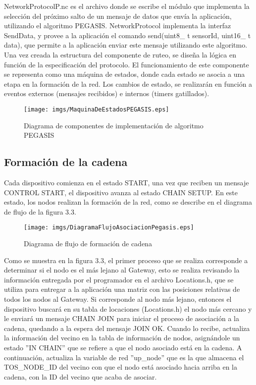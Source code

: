 NetworkProtocolP.nc es el archivo donde se escribe  el módulo que implementa la selección del próximo salto de un mensaje de datos que envía la aplicación, utilizando el algoritmo PEGASIS. NetworkProtocol implementa la interfaz SendData, y provee a la aplicación el comando send(uint8\_ t sensorId, uint16\_ t data), que permite a la aplicación enviar este mensaje utilizando este algoritmo.\\

Una vez creada la estructura del componente de ruteo, se diseña la lógica en función de la especificación del protocolo. El funcionamiento de este componente se representa como una máquina de estados, donde cada estado se asocia a una etapa en la formación de la red. Los cambios de estado, se realizarán en función a eventos externos (mensajes recibidos) e internos (timers gatillados).\\

\begin{figure}[H]
  \centering
 \texttt{[image: imgs/MaquinaDeEstadosPEGASIS.eps]}
 \caption{Diagrama de componentes de implementación de algoritmo PEGASIS}
\end{figure}

\subsection{Formación de la cadena}

Cada dispositivo comienza en el estado START, una vez que reciben un mensaje CONTROL START, el dispositivo avanza al estado CHAIN SETUP. En este estado, los nodos realizan la formación de la red, como se describe en el diagrama de flujo de la figura 3.3.

\begin{figure}[H]
  \centering
 \texttt{[image: imgs/DiagramaFlujoAsociacionPegasis.eps]}
 \caption{Diagrama de flujo de formación de cadena}
\end{figure}

Como se muestra en la figura 3.3, el primer proceso que se realiza corresponde a determinar si el nodo es el más lejano al Gateway, esto se realiza revisando la información entregada por el programador en el archivo Locations.h, que se utiliza para entregar a la aplicación una matriz con las posiciones relativas de todos los nodos al Gateway. Si corresponde al nodo más lejano, entonces el dispositivo buscará en su tabla de locaciones (Locations.h) el nodo más cercano y le enviará un mensaje CHAIN JOIN para iniciar el proceso de asociación a la cadena, quedando a la espera del mensaje JOIN OK. Cuando lo recibe, actualiza la información del vecino en la tabla de información de nodos, asignándole un estado ''IN CHAIN'' que se refiere a que el nodo asociado está en la cadena. A continuación, actualiza la variable de red ''up\_node'' que es la que almacena el TOS\_NODE\_ID del vecino con que el nodo está asociado hacia arriba en la cadena, con la ID del vecino que acaba de asociar.\\

